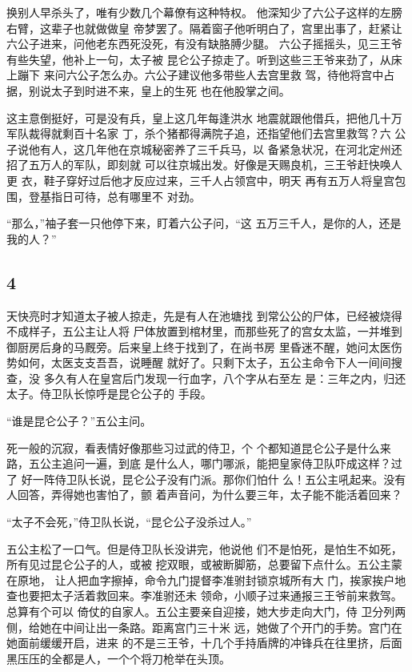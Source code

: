 换别人早杀头了，唯有少数几个幕僚有这种特权。
他深知少了六公子这样的左膀右臂，这辈子也就做做皇
帝梦罢了。隔着窗子他听明白了，宫里出事了，赶紧让
六公子进来，问他老东西死没死，有没有缺胳膊少腿。
六公子摇摇头，见三王爷有些失望，他补上一句，太子被
昆仑公子掠走了。听到这些三王爷来劲了，从床上蹦下
来问六公子怎么办。六公子建议他多带些人去宫里救
驾，待他将宫中占据，别说太子到时进不来，皇上的生死
也在他股掌之间。

这主意倒挺好，可是没有兵，皇上这几年每逢洪水
地震就跟他借兵，把他几十万军队裁得就剩百十名家
丁，杀个猪都得满院子追，还指望他们去宫里救驾？六
公子说他有人，这几年他在京城秘密养了三千兵马，以
备紧急状况，在河北定州还招了五万人的军队，即刻就
可以往京城出发。好像是天赐良机，三王爷赶快唤人更
衣，鞋子穿好过后他才反应过来，三千人占领宫中，明天
再有五万人将皇宫包围，登基指日可待，总有哪里不
对劲。

“那么，”袖子套一只他停下来，盯着六公子问，“这
五万三千人，是你的人，还是我的人？”
\newline

{\centering\subsection{4}}

天快亮时才知道太子被人掠走，先是有人在池塘找
到常公公的尸体，已经被烧得不成样子，五公主让人将
尸体放置到棺材里，而那些死了的宫女太监，一并堆到
御厨房后身的马厩旁。后来皇上终于找到了，在尚书房
里昏迷不醒，她问太医伤势如何，太医支支吾吾，说睡醒
就好了。只剩下太子，五公主命令下人一间间搜查，没
多久有人在皇宫后门发现一行血字，八个字从右至左
是：三年之内，归还太子。侍卫队长惊呼是昆仑公子的
手段。

“谁是昆仑公子？”五公主问。

死一般的沉寂，看表情好像那些习过武的侍卫，个
个都知道昆仑公子是什么来路，五公主追问一遍，到底
是什么人，哪门哪派，能把皇家侍卫队吓成这样？过了
好一阵侍卫队长说，昆仑公子没有门派。那你们怕什
么！五公主吼起来。没有人回答，弄得她也害怕了，颤
着声音问，为什么要三年，太子能不能活着回来？

“太子不会死，”侍卫队长说，“昆仑公子没杀过人。”

五公主松了一口气。但是侍卫队长没讲完，他说他
们不是怕死，是怕生不如死，所有见过昆仑公子的人，或被
挖双眼，或被断脚筋，总要留下点什么。五公主蒙在原地，
让人把血字擦掉，命令九门提督李准驸封锁京城所有大
门，挨家挨户地查也要把太子活着救回来。李准驸还未
领命，小顺子过来通报三王爷前来救驾。总算有个可以
倚仗的自家人。五公主要亲自迎接，她大步走向大门，侍
卫分列两侧，给她在中间让出一条路。距离宫门三十米
远，她做了个开门的手势。宫门在她面前缓缓开启，进来
的不是三王爷，十几个手持盾牌的冲锋兵在往里挤，后面
黑压压的全都是人，一个个将刀枪举在头顶。

